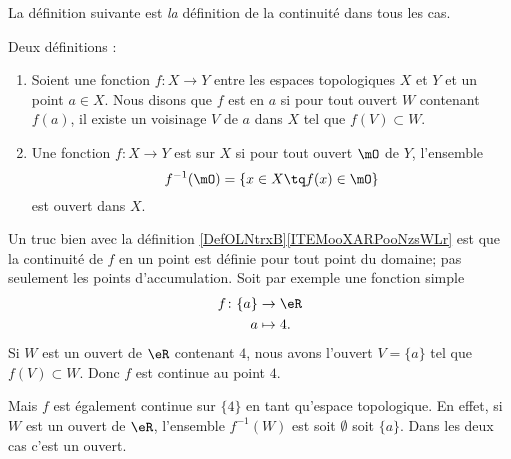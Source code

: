 La définition suivante est \emph{la} définition de la continuité dans tous les cas.
\begin{definition}\label{DefOLNtrxB}
    Deux définitions :
    \begin{enumerate}
        \item   \label{ITEMooXARPooNzsWLr}
            Soient une fonction \( f\colon X\to Y\) entre les espaces topologiques \( X\) et \( Y\) et un point \( a\in X\). Nous disons que \( f\) est  en \( a\) si pour tout ouvert \( W\) contenant \( f(a)\), il existe un voisinage \( V\) de \( a\) dans \( X\) tel que \( f(V)\subset W\).
        \item       \label{ITEMooEHGWooDdITRV}
    Une fonction \( f\colon X\to Y\) est  sur \( X\) si pour tout ouvert \( \mO\) de \( Y\), l'ensemble
    \begin{equation}      \label{defFminus1ofaset}
      f^{-1}(\mO) = \{ x \in X \tq f(x) \in \mO\}
    \end{equation}
est ouvert dans \( X\).
    \end{enumerate}
\end{definition}

\begin{example}
    Un truc bien avec la définition \ref{DefOLNtrxB}\ref{ITEMooXARPooNzsWLr} est que la continuité de \( f\) en un point est définie pour tout point du domaine; pas seulement les points d'accumulation. Soit par exemple une fonction simple
    \begin{equation}
        \begin{aligned}
            f\colon \{a\}&\to \eR \\
            a&\mapsto 4. 
        \end{aligned}
    \end{equation}
    Si \( W\) est un ouvert de \( \eR\) contenant \( 4\), nous avons l'ouvert \( V=\{a\}\) tel que \( f(V)\subset W\). Donc \( f\) est continue au point \( 4\).

    Mais \( f\) est également continue sur \( \{4\}\) en tant qu'espace topologique. En effet, si \( W\) est un ouvert de \( \eR\), l'ensemble \( f^{-1}(W)\) est soit \( \emptyset\) soit \( \{a\}\). Dans les deux cas c'est un ouvert.
\end{example}

